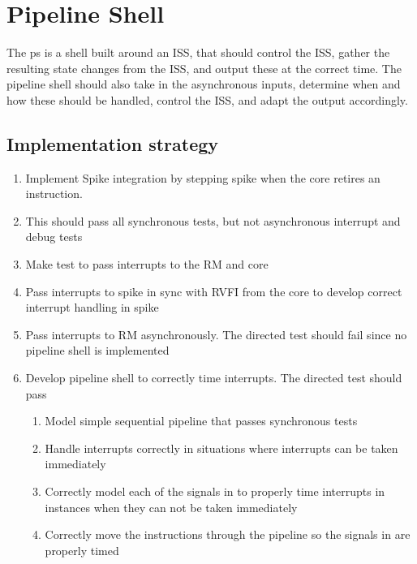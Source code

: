 \chapter{Pipeline Shell}
\label{ch:PipelineShell}




The \gls{ps} is a shell built around an ISS, that should control the ISS, gather the resulting state changes from the ISS, and output these at the correct time. The pipeline shell should also take in the asynchronous inputs, determine when and how these should be handled, control the ISS, and adapt the output accordingly. 

\section{Implementation strategy}

\begin{enumerate}
    \item Implement Spike integration by stepping spike when the core retires an instruction.
    \item This should pass all synchronous tests, but not asynchronous interrupt and debug tests
    \item Make test to pass interrupts to the RM and core
    \item Pass interrupts to spike in sync with RVFI from the core to develop correct interrupt handling in spike
    \item Pass interrupts to RM asynchronously. The directed test should fail since no pipeline shell is implemented
    \item Develop pipeline shell to correctly time interrupts. The directed test should pass
    \begin{enumerate}
        \item Model simple sequential pipeline that passes synchronous tests
        \item Handle interrupts correctly in situations where interrupts can be taken immediately
        \item Correctly model each of the signals in  to properly time interrupts in instances when they can not be taken immediately
        \item Correctly move the instructions through the pipeline so the signals in  are properly timed
    \end{enumerate}
\end{enumerate}

